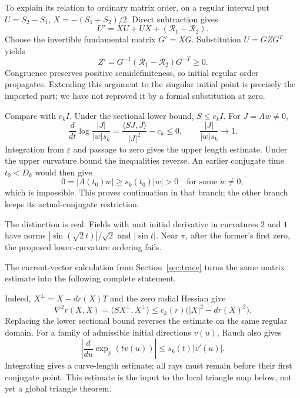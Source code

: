 \documentclass[12pt,reqno]{amsart}
\begin{document}
To explain its relation to ordinary matrix order, on a regular interval put \(U=S_2-S_1\), \(X=-(S_1+S_2)/2\). Direct subtraction gives
\[
U'=XU+UX+(\mathcal R_1-\mathcal R_2).
\]
Choose the invertible fundamental matrix \(G'=XG\). Substitution \(U=GZG^T\) yields
\[
Z'=G^{-1}(\mathcal R_1-\mathcal R_2)G^{-T}\ge0.
\]
Congruence preserves positive semidefiniteness, so initial regular order propagates. Extending this argument to the singular initial point is precisely the imported part; we have not reproved it by a formal substitution at zero.

Compare with \(c_kI\). Under the sectional lower bound, \(S\le c_kI\). For \(J=Aw\ne0\),
\[
\frac d{dt}\log\frac{|J|}{|w|s_k}
=\frac{\langle SJ,J\rangle}{|J|^2}-c_k\le0,
\qquad \frac{|J|}{|w|s_k}\longrightarrow1.
\]
Integration from \(\varepsilon\) and passage to zero gives the upper length estimate. Under the upper curvature bound the inequalities reverse. An earlier conjugate time \(t_0<D_k\) would then give
\[
0=|A(t_0)w|\ge s_k(t_0)|w|>0
\quad\text{for some }w\ne0,
\]
which is impossible. This proves continuation in that branch; the other branch keeps its actual-conjugate restriction.

The distinction is real. Fields with unit initial derivative in curvatures \(2\) and \(1\) have norms \(|\sin(\sqrt2t)|/\sqrt2\) and \(|\sin t|\). Near \(\pi\), after the former's first zero, the proposed lower-curvature ordering fails.

The current-vector calculation from Section~\ref{sec:trace} turns the same matrix estimate into the following complete statement.

\begin{samepage}
\begin{theorem}
\label{thm:hessian}

\end{theorem}
\end{samepage}

Indeed, \(X^\perp=X-dr(X)T\) and the zero radial Hessian give
\[
\nabla^2r(X,X)=\langle SX^\perp,X^\perp\rangle
\le c_k(r)\bigl(|X|^2-dr(X)^2\bigr).
\]
Replacing the lower sectional bound reverses the estimate on the same regular domain. For a family of admissible initial directions \(v(u)\), Rauch also gives
\[
\left|\frac d{du}\exp_p(tv(u))\right|\le s_k(t)|v'(u)|.
\]
Integrating gives a curve-length estimate; all rays must remain before their first conjugate point. This estimate is the input to the local triangle map below, not yet a global triangle theorem.
\end{document}
